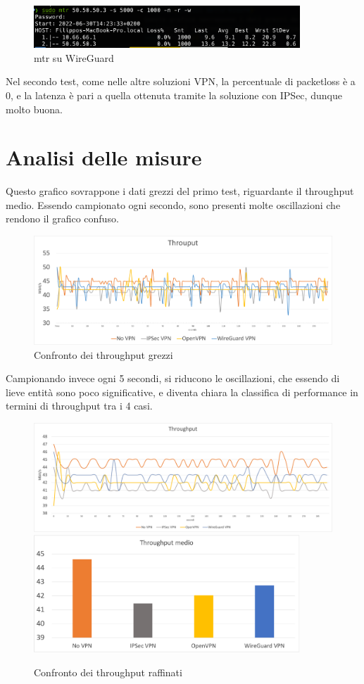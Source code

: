 \begin{figure}[ht]
    \centering
    \includegraphics[width=10cm]{figure/mrt_16min_wg.png}
    \caption{mtr su WireGuard}
\end{figure}

Nel secondo test, come nelle altre soluzioni VPN, la percentuale di packetloss è a 0, e la latenza è pari a quella ottenuta tramite la soluzione con IPSec, dunque molto buona.

\section{Analisi delle misure}
Questo grafico sovrappone i dati grezzi del primo test, riguardante il throughput medio. Essendo campionato ogni secondo, sono presenti molte oscillazioni che rendono il grafico confuso.
\begin{figure}[ht]
    \centering
    \includegraphics[width=14cm]{figure/rawThroughput.png}
    \caption{Confronto dei throughput grezzi}
\end{figure}

Campionando invece ogni 5 secondi, si riducono le oscillazioni, che essendo di lieve entità sono poco significative, e diventa chiara la classifica di performance in termini di throughput tra i 4 casi.


\begin{figure}[ht]
    \centering
    \includegraphics[width=14cm]{figure/fineThroughput.png}
    \includegraphics[width=10cm]{figure/avg.png}
    \caption{Confronto dei throughput raffinati}
\end{figure}

